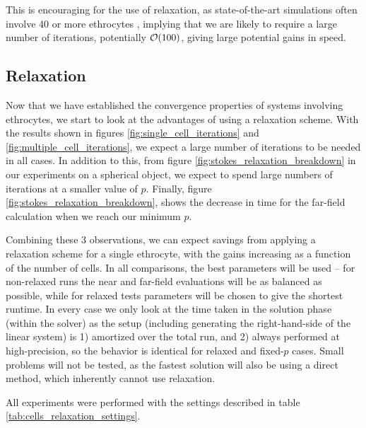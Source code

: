 This is encouraging for the use of relaxation, as state-of-the-art simulations often involve 40 or more ethrocytes \cite{Liu2009,RahimianETal2010}, implying that we are likely to require a large number of iterations, potentially $\mathcal{O}(100)$, giving large potential gains in speed.

\subsection{Relaxation}\label{sec:stokes_ethrocyte_relaxation}

Now that we have established the convergence properties of systems involving ethrocytes, we start to look at the advantages of using a relaxation scheme. With the results shown in figures \ref{fig:single_cell_iterations} and \ref{fig:multiple_cell_iterations}, we expect a large number of iterations to be needed in all cases. In addition to this, from figure \ref{fig:stokes_relaxation_breakdown} in our experiments on a spherical object, we expect to spend large numbers of iterations at a smaller value of $p$. Finally, figure \ref{fig:stokes_relaxation_breakdown}, shows the decrease in time for the far-field calculation when we reach our minimum $p$.

Combining these 3 observations, we can expect savings from applying a relaxation scheme for a single ethrocyte, with the gains increasing as a function of the number of cells. In all comparisons, the best parameters will be used -- for non-relaxed runs the near and far-field evaluations will be as balanced as possible, while for relaxed tests parameters will be chosen to give the shortest runtime. In every case we only look at the time taken in the solution phase (within the {\gmres} solver) as the setup (including generating the right-hand-side of the linear system) is 1) amortized over the total run, and 2) always performed at high-precision, so the behavior is identical for relaxed and fixed-$p$ cases. Small problems will not be tested, as the fastest solution will also be using a direct method, which inherently cannot use relaxation.

All experiments were performed with the settings described in table \ref{tab:cells_relaxation_settings}.

